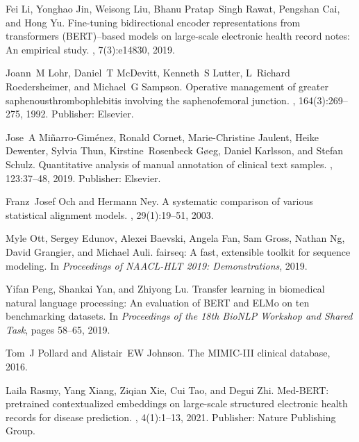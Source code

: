 \documentclass[runningheads]{llncs}
\begin{document}
\begin{thebibliography}{10}
Fei Li, Yonghao Jin, Weisong Liu, Bhanu Pratap~Singh Rawat, Pengshan Cai, and
  Hong Yu.
\newblock Fine-tuning bidirectional encoder representations from transformers
  ({BERT})–based models on large-scale electronic health record notes: An
  empirical study.
, 7(3):e14830, 2019.

Joann~M Lohr, Daniel~T {McDevitt}, Kenneth~S Lutter, L~Richard Roedersheimer,
  and Michael~G Sampson.
\newblock Operative management of greater saphenousthrombophlebitis involving
  the saphenofemoral junction.
, 164(3):269--275, 1992.
\newblock Publisher: Elsevier.

Jose~A Miñarro-Giménez, Ronald Cornet, Marie-Christine Jaulent, Heike
  Dewenter, Sylvia Thun, Kirstine~Rosenbeck Gøeg, Daniel Karlsson, and Stefan
  Schulz.
\newblock Quantitative analysis of manual annotation of clinical text samples.
, 123:37--48, 2019.
\newblock Publisher: Elsevier.

Franz~Josef Och and Hermann Ney.
\newblock A systematic comparison of various statistical alignment models.
, 29(1):19--51, 2003.

Myle Ott, Sergey Edunov, Alexei Baevski, Angela Fan, Sam Gross, Nathan Ng,
  David Grangier, and Michael Auli.
\newblock fairseq: A fast, extensible toolkit for sequence modeling.
\newblock In {\em Proceedings of {NAACL}-{HLT} 2019: Demonstrations}, 2019.

Yifan Peng, Shankai Yan, and Zhiyong Lu.
\newblock Transfer learning in biomedical natural language processing: An
  evaluation of {BERT} and {ELMo} on ten benchmarking datasets.
\newblock In {\em Proceedings of the 18th {BioNLP} Workshop and Shared Task},
  pages 58--65, 2019.

Tom~J Pollard and Alistair~{EW} Johnson.
\newblock The {MIMIC}-{III} clinical database, 2016.

Laila Rasmy, Yang Xiang, Ziqian Xie, Cui Tao, and Degui Zhi.
\newblock Med-{BERT}: pretrained contextualized embeddings on large-scale
  structured electronic health records for disease prediction.
, 4(1):1--13, 2021.
\newblock Publisher: Nature Publishing Group.


\end{thebibliography}
\end{document}
